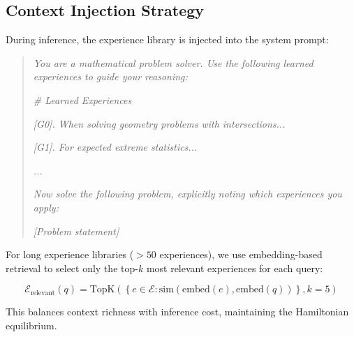 \subsection{Context Injection Strategy}

During inference, the experience library is injected into the system prompt:

\begin{quote}
\small
\textit{You are a mathematical problem solver. Use the following learned experiences to guide your reasoning:}

\textit{\# Learned Experiences}

\textit{[G0]. When solving geometry problems with intersections...}

\textit{[G1]. For expected extreme statistics...}

\textit{...}

\textit{Now solve the following problem, explicitly noting which experiences you apply:}

\textit{[Problem statement]}
\end{quote}

For long experience libraries ($>50$ experiences), we use embedding-based retrieval to select only the top-$k$ most relevant experiences for each query:

\begin{equation}
\mathcal{E}_{\text{relevant}}(q) = \text{TopK}\left(\left\{ e \in \mathcal{E} : \text{sim}(\text{embed}(e), \text{embed}(q)) \right\}, k=5\right)
\end{equation}

This balances context richness with inference cost, maintaining the Hamiltonian equilibrium.


